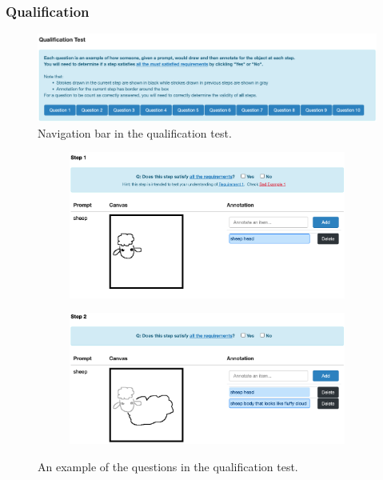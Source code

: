 
\subsubsection{Qualification}

\begin{figure}[!htb]
\includegraphics[width=\linewidth]{data_collection/v1_qual_header.png}  
\caption{Navigation bar in the qualification test.}
\label{v1.qualification.nav}
\end{figure}

\begin{figure}[!htb]
\begin{subfigure}{\textwidth}
\centering
\includegraphics[width=.8\linewidth]{data_collection/v1_qual_q9_1.png}  
\end{subfigure}
\newline
\begin{subfigure}{\textwidth}
\centering
\includegraphics[width=.8\linewidth]{data_collection/v1_qual_q9_2.png}  
\end{subfigure}
\caption{An example of the questions in the qualification test.}
\label{v1.qualification.q9}
\end{figure}


